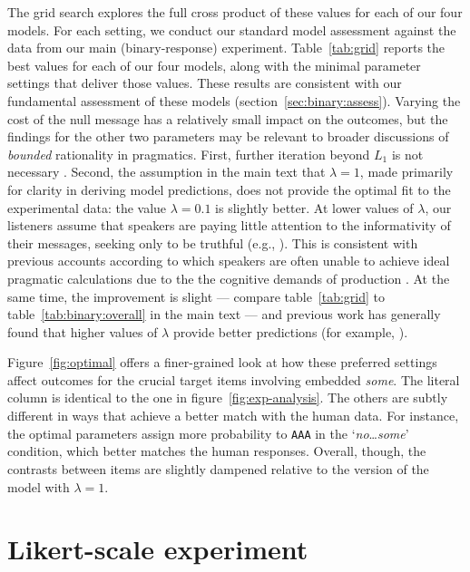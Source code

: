 \documentclass[leqno,12pt]{article}
\newcommand{\secref}[1]{section~\ref{#1}}
\newcommand{\Figref}[1]{Figure~\ref{#1}}
\newcommand{\figref}[1]{figure~\ref{#1}}
\newcommand{\Tabref}[1]{Table~\ref{#1}}
\newcommand{\tabref}[1]{table~\ref{#1}}
\newcommand{\word}[1]{\emph{#1}}
\newcommand{\UncertaintyListener}[1][]{L_{#1}}
\newcommand{\world}[1]{\texttt{#1}}
\newcommand{\target}[2]{`\word{#1}\ldots\word{#2}'}
\begin{document}
{\begin{appendix}
The grid search explores the full cross product of these values for
each of our four models. For each setting, we conduct our standard
model assessment against the data from our main (binary-response)
experiment. \Tabref{tab:grid} reports the best values for each of our
four models, along with the minimal parameter settings that deliver
those values. These results are consistent with our fundamental
assessment of these models (\secref{sec:binary:assess}).  Varying the
cost of the null message has a relatively small impact on the
outcomes, but the findings for the other two parameters may be
relevant to broader discussions of \emph{bounded} rationality in
pragmatics. First, further iteration beyond $\UncertaintyListener[1]$
is not necessary \citep{Vogel-etal:2014}. Second, the assumption in
the main text that $\lambda=1$, made primarily for clarity in deriving
model predictions, does not provide the optimal fit to the
experimental data: the value $\lambda = 0.1$ is slightly better.  At
lower values of $\lambda$, our listeners assume that speakers are
paying little attention to the informativity of their messages,
seeking only to be truthful (e.g., \citealt{McMahan:Stone:2015}).
This is consistent with previous accounts according to which speakers
are often unable to achieve ideal pragmatic calculations due to the
the cognitive demands of production
\citep{pechmann1989,levelt1993,engelhardt2006,dale1995,van-deemter2012,gatt2013}. At
the same time, the improvement is slight --- compare \tabref{tab:grid}
to \tabref{tab:binary:overall} in the main text --- and previous work
has generally found that higher values of $\lambda$ provide better
predictions (for example,
\citealt{Kao2014,Kao-etal:2014,lassitergoodman15}).

\Figref{fig:optimal} offers a finer-grained look at how these
preferred settings affect outcomes for the crucial target items
involving embedded \word{some}. The literal column is identical to the
one in \figref{fig:exp-analysis}. The others are subtly different in
ways that achieve a better match with the human data. For instance,
the optimal parameters assign more probability to \world{AAA} in the
\target{no}{some} condition, which better matches the human
responses. Overall, though, the contrasts between items are slightly dampened
relative to the version of the model with $\lambda=1$.




\section{Likert-scale experiment}\label{app:likert}


\end{appendix}}
\end{document}
